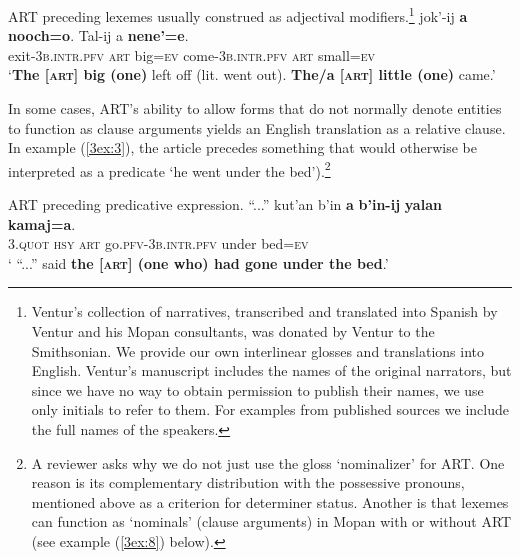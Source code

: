 \documentclass[output=paper]{langsci/langscibook}
\begin{document}
\begin{exe}
\ex\label{3ex:2}
ART preceding lexemes usually construed as adjectival modifiers.\footnote{{Ventur's collection of narratives, transcribed and translated into Spanish by Ventur and his Mopan consultants, was donated by Ventur to the Smithsonian. We provide our own interlinear glosses and translations into English. Ventur's manuscript includes the names of the original narrators, but since we have no way to obtain permission to publish their names, we use only initials to refer to them. For examples from published sources we include the full names of the speakers.}}
\exi{}
\gll 	jok'-ij				{\textbf{a}}	{\textbf{nooch=o}}.	Tal-ij					a		{\textbf{nene'=e}}. \\
	exit-{\textsc{3b.intr.pfv}}	{\textsc{art}}	big={\textsc{ev}}	come-{\textsc{3b.intr.pfv}}	{\textsc{art}}	small={\textsc{ev}} \\
\glt	`{{\textbf{The [{\textsc{art}}] big (one)}} left off (lit. went out).  {\textbf{The/a [{\textsc{art}}] little (one)}} came.}'
\end{exe}


In some cases, ART's ability to allow forms that do not normally denote entities to function as clause arguments yields an English translation as a relative clause. In example (\ref{3ex:3}), the article precedes something that would otherwise be interpreted as a predicate `he went under the bed').\footnote{A reviewer asks why we do not just use the gloss `nominalizer' for ART. One reason is its complementary distribution with the possessive pronouns, mentioned above as a criterion for determiner status. Another is that lexemes can function as `nominals' (clause arguments) in Mopan with or without ART (see example (\ref{3ex:8}) below).}

\begin{exe}
\ex\label{3ex:3}
ART preceding predicative expression. 
\exi{}
\gll	``...''	kut'an		b'in		{\textbf{a}}	{\textbf{b'in-ij}} 			{\textbf{yalan}}	{\textbf{kamaj=a}}.\\
	{}	3.{\textsc{quot}}	{\textsc{hsy}}	{\textsc{art}}	go.{\textsc{pfv-3b.intr.pfv}} 	under		bed={\textsc{ev}}\\
\glt	` ``...'' said {\textbf{the [{\textsc{art}}] (one who) had gone under the bed}}.'
\end{exe}
\end{document}
